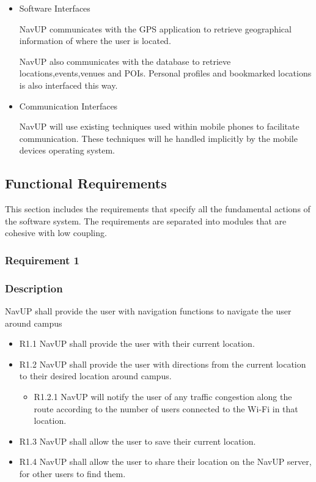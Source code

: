 \documentclass{article}
\begin{document}
\begin{itemize}
			\item Software Interfaces
			
			NavUP communicates with the GPS application to retrieve geographical information of where the user is located.
			
			NavUP also communicates with the database to retrieve locations,events,venues and POIs. Personal profiles and bookmarked locations is also interfaced this way.
			
			
			\item Communication Interfaces
			
			NavUP will use existing techniques used within mobile phones to facilitate communication. These techniques will he handled implicitly by the mobile devices operating system.
			
		\end{itemize}
    \subsection{Functional Requirements}
    This section includes the requirements that specify all the fundamental actions of the software system. The requirements are separated into modules that are cohesive with low coupling.
    
    	\subsubsection{Requirement 1}
    	
    	\subsubsection*{Description}
    	NavUP shall provide the user with navigation functions to navigate the user around campus
        \begin{itemize}
        \item R1.1 NavUP shall provide the user with their current location.
        \item R1.2 NavUP shall provide the user with directions from the current location to their desired location around campus.
            \begin{itemize}
                \item R1.2.1 NavUP will notify the user of any traffic congestion along the route according to the number of users connected to the Wi-Fi in that location.
            \end{itemize}
        \item R1.3 NavUP shall allow the user to save their current location.
        \item R1.4 NavUP shall allow the user to share their location on the NavUP server, for other users to find them.
        \end{itemize}
\end{document}
